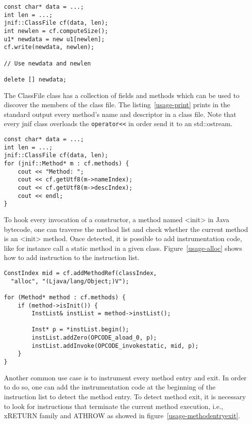 \begin{lstlisting}[caption=Encoding a class,label=usage-write]
const char* data = ...;
int len = ...;
jnif::ClassFile cf(data, len);
int newlen = cf.computeSize();
u1* newdata = new u1[newlen];
cf.write(newdata, newlen);

// Use newdata and newlen

delete [] newdata;
\end{lstlisting}



The ClassFile class has a collection of fields and methods which can be used to discover the members of the class file. 
The listing~\ref{usage-print} prints in the standard output every method's name and descriptor in a class file. 
Note that every jnif class overloads the \verb|operator<<| in order send it to an std::ostream.

\begin{lstlisting}[caption=Traversing all methods in a class,label=usage-print]
const char* data = ...;
int len = ...;
jnif::ClassFile cf(data, len);
for (jnif::Method* m : cf.methods) {
	cout << "Method: ";
	cout << cf.getUtf8(m->nameIndex);
	cout << cf.getUtf8(m->descIndex);
	cout << endl;
}
\end{lstlisting}

To hook every invocation of a constructor, a method named <init> in Java bytecode, 
one can traverse the method list and check whether the current method is an <init> method. 
Once detected, it is possible to add instrumentation code, like for instance call a static method in a given class. 
Figure~\ref{usage-alloc} shows how to add instruction to the instruction list.

\begin{lstlisting}[caption=Instrumenting constructor entries,label=usage-alloc]
ConstIndex mid = cf.addMethodRef(classIndex, 
  "alloc", "(Ljava/lang/Object;)V");

for (Method* method : cf.methods) {
	if (method->isInit()) {
		InstList& instList = method->instList();

		Inst* p = *instList.begin();
		instList.addZero(OPCODE_aload_0, p);
		instList.addInvoke(OPCODE_invokestatic, mid, p);
	}
}
\end{lstlisting}




Another common use case is to instrument every method entry and exit. In order to do so, one can add the instrumentation code at the beginning of the instruction list to detect the method entry. To detect method exit, it is necessary to look for instructions that terminate the current method execution, i.e., xRETURN family and ATHROW as showed in figure~\ref{usage-methodentryexit}.

